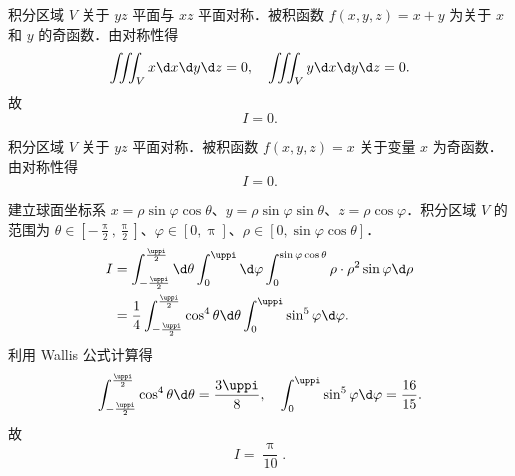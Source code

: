 \begin{solution}
    积分区域 $V$ 关于 $yz$ 平面与 $xz$ 平面对称．被积函数 $f(x, y, z) = x + y$ 为关于 $x$ 和 $y$ 的奇函数．由对称性得
    \begin{equation}
        \iiint_{V} x \d x \d y \d z = 0, \quad \iiint_{V} y \d x \d y \d z = 0.
    \end{equation}
    故
    \begin{equation}
        \boxed{I = 0}.
    \end{equation}

    积分区域 $V$ 关于 $yz$ 平面对称．被积函数 $f(x, y, z) = x$ 关于变量 $x$ 为奇函数．由对称性得
    \begin{equation}
        \boxed{I = 0}.
    \end{equation}

    建立球面坐标系 $x = \rho \sin \varphi \cos \theta$、$y = \rho \sin \varphi \sin \theta$、$z = \rho \cos \varphi$．积分区域 $V$ 的范围为 $\theta \in [-\frac{\uppi}{2}, \frac{\uppi}{2}]$、$\varphi \in [0, \uppi]$、$\rho \in [0, \sin \varphi \cos \theta]$．
    \begin{equation}
        \begin{aligned}
            I & = \int_{-\frac{\uppi}{2}}^{\frac{\uppi}{2}} \d \theta \int_{0}^{\uppi} \d \varphi \int_{0}^{\sin \varphi \cos \theta} \rho \cdot \rho^{2} \sin \varphi \d \rho \\
              & = \frac{1}{4} \int_{-\frac{\uppi}{2}}^{\frac{\uppi}{2}} \cos^{4} \theta \d \theta \int_{0}^{\uppi} \sin^{5} \varphi \d \varphi.
        \end{aligned}
    \end{equation}
    利用 Wallis 公式计算得
    \begin{equation}
        \int_{-\frac{\uppi}{2}}^{\frac{\uppi}{2}} \cos^{4} \theta \d \theta = \frac{3\uppi}{8}, \quad \int_{0}^{\uppi} \sin^{5} \varphi \d \varphi = \frac{16}{15}.
    \end{equation}
    故
    \begin{equation}
        \boxed{I = \frac{\uppi}{10}}.
    \end{equation}


\end{solution}
